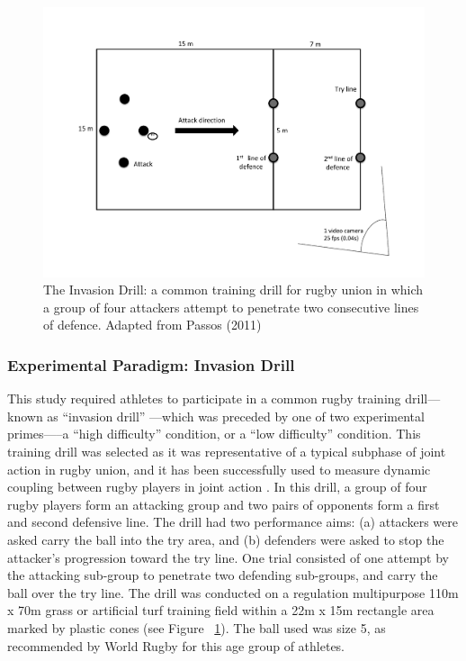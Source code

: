 \begin{figure}[htbp]
  \centering
      \includegraphics[width=0.9\linewidth,keepaspectratio] {images/invasionDrill}
      \caption{The Invasion Drill: a common training drill for rugby union in which a group of four attackers attempt to penetrate two consecutive lines of defence. Adapted from Passos (2011)}
      \label{fig:invasionDrill}
  \end{figure}


\subsubsection{Experimental Paradigm: Invasion Drill}
This study required athletes to participate in a common rugby training drill---known as ``invasion drill'' \citep{Biscombe1998}---which was preceded by one of two experimental primes—--a ``high difficulty'' condition, or a ``low difficulty'' condition.  This training drill was selected as it was representative of a typical subphase of joint action in rugby union, and it has been successfully used to measure dynamic coupling between rugby players in joint action \citep[see][]{Passos2011}.  In this drill, a group of four rugby players form an attacking group and two pairs of opponents form a first and second defensive line.  The drill had two performance aims: (a) attackers were asked carry the ball into the try area, and (b) defenders were asked to stop the attacker’s progression toward the try line.
One trial consisted of one attempt by the attacking sub-group to penetrate two defending sub-groups, and carry the ball over the try line. The drill was conducted on a regulation multipurpose 110m x 70m grass or artificial turf training field within a 22m x 15m rectangle area marked by plastic cones (see Figure ~\ref{fig:invasionDrill}). The ball used was size 5, as recommended by World Rugby for this age group of athletes.


